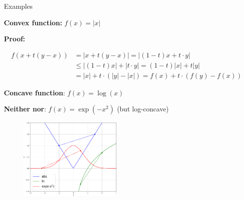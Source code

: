 \documentclass[11pt,compress,t,notes=noshow, xcolor=table]{beamer}
\begin{document}
\begin{vbframe}{Examples}

\textbf{Convex function:} $f(x) = |x|$

\begin{footnotesize}
    \textbf{Proof:}
    
    \vspace*{-0.75cm}
    
    \begin{align*}
        f\left(x + t(y - x)\right) &= |x + t(y - x)| = |(1 - t) x + t \cdot y| \\
        & \le |(1 - t) x| + |t \cdot y| = (1 - t) |x| + t |y| \\
        &= |x| + t \cdot (|y| - |x|) = f(x) + t \cdot (f(y) - f(x))
    \end{align*}
\end{footnotesize}

\textbf{Concave function}: $f(x) = \log(x)$

\vspace*{0.2cm}

\textbf{Neither nor}: $f(x) = \exp(-x^2)$ (but log-concave)

\begin{figure}
    \centering
    \includegraphics[width=0.45\textwidth]{figure_man/conv_conc_functions.png}
\end{figure}

\end{vbframe}
\end{document}
